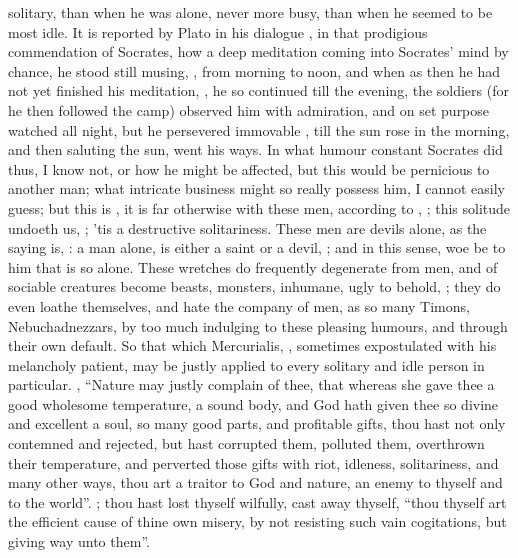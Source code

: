 solitary, than when he was alone, never more busy, than when he seemed to be
most idle. It is reported by Plato in his dialogue , in that prodigious commendation of Socrates, how a deep meditation
coming into Socrates' mind by chance, he stood still musing, , from morning to noon, and when as then he had not yet finished
his meditation, , he so continued till the evening, the
soldiers (for he then followed the camp) observed him with admiration, and on
set purpose watched all night, but he persevered immovable , till the sun rose in the morning, and then saluting the sun, went his
ways. In what humour constant Socrates did thus, I know not, or how he might be
affected, but this would be pernicious to another man; what intricate business
might so really possess him, I cannot easily guess; but this is , it is far otherwise with these men, according to \Seneca{}, ; this solitude undoeth us, ; 'tis a destructive solitariness. These men are devils alone, as the
saying is, : a man alone, is either a saint
or a devil, ; and
 in this sense, woe be to him that is so
alone. These wretches do frequently degenerate from men, and of sociable
creatures become beasts, monsters, inhumane, ugly to behold, ;
they do even loathe themselves, and hate the company of men, as so many Timons,
Nebuchadnezzars, by too much indulging to these pleasing humours, and through
their own default. So that which Mercurialis, , sometimes expostulated with his melancholy patient, may be justly applied
to every solitary and idle person in particular.
, \etc{} \enquote{Nature
may justly complain of thee, that whereas she gave thee a good wholesome
temperature, a sound body, and God hath given thee so divine and excellent a
soul, so many good parts, and profitable gifts, thou hast not only contemned
and rejected, but hast corrupted them, polluted them, overthrown their
temperature, and perverted those gifts with riot, idleness, solitariness, and
many other ways, thou art a traitor to God and nature, an enemy to thyself and
to the world}. ; thou hast lost thyself wilfully, cast
away thyself, \enquote{thou thyself art the efficient cause of thine own misery, by not
resisting such vain cogitations, but giving way unto them}.


